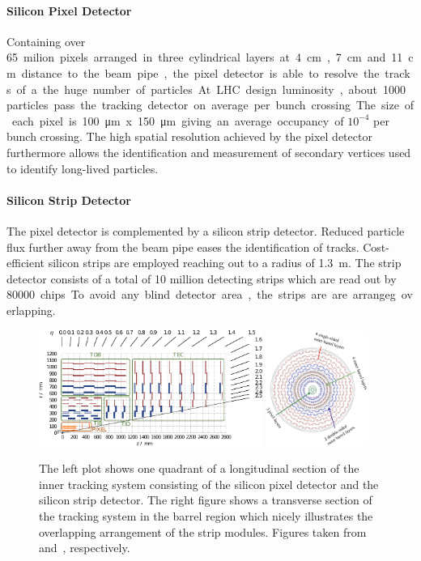 \paragraph{Silicon Pixel Detector} Containing over \SI{65} milion pixels
arranged in three cylindrical layers at \SI{4}{\centi\meter},
\SI{7}{\centi\meter} and \SI{11}{\centi\meter} distance to the beam pipe, the
pixel detector is able to resolve the tracks of a the huge number of particles.
At LHC design luminosity, about 1000 particles pass the tracking detector on
average per bunch crossing. The size of each pixel is \SI{100}{\micro \meter} x
\SI{150}{\micro \meter} giving an average occupancy of $10^{-4}$ per bunch
crossing. The high spatial resolution achieved by the pixel detector furthermore
allows the identification and measurement of secondary vertices used to identify
long-lived particles.

\paragraph{Silicon Strip Detector} The pixel detector is complemented by a silicon
strip detector. Reduced particle flux further away from the beam pipe eases the identification
of tracks. Cost-efficient silicon strips are employed reaching out to
a radius of \SI{1.3}{\meter}. The strip detector consists of a total of 10 million
detecting strips which are read out by \SI{80000} chips. To avoid any blind
detector area, the strips are are arrangeg overlapping.

\begin{figure}[htp]
    \centering
    \includegraphics[width=0.65\textwidth]{figures/experimental_setup/tracker.pdf}\hfill
    \includegraphics[width=0.3\textwidth]{figures/experimental_setup/tracking_sytem_barrel_slice.png}
    \caption[Inner Tracking System]{The left plot shows one quadrant of a
        longitudinal section of the inner tracking system consisting of the
        silicon pixel detector and the silicon strip detector. The right figure shows a
        transverse section of the tracking system in the barrel region which
        nicely illustrates the overlapping arrangement of the strip modules. Figures taken
        from~\cite{Berger:2014aca} and~\cite{cmsweb:innertracker}, respectively.}
    \label{fig:cms:inner_tracking}
\end{figure}

